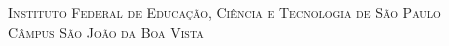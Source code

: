 \thispagestyle{empty}

{
\center

\vspace*{4.5cm}
\noindent
\chaptitlefont\HUGE\textsc{\thetitle}

\vspace{4.5cm}
\noindent
\chaptitlefont\Large\textsc{\theauthor}

\chaptitlefont\tiny\textsc{Instituto Federal de Educação, Ciência e Tecnologia de São Paulo}\\
\chaptitlefont\tiny\textsc{Câmpus São João da Boa Vista}
    
\vfill
}

\restoregeometry